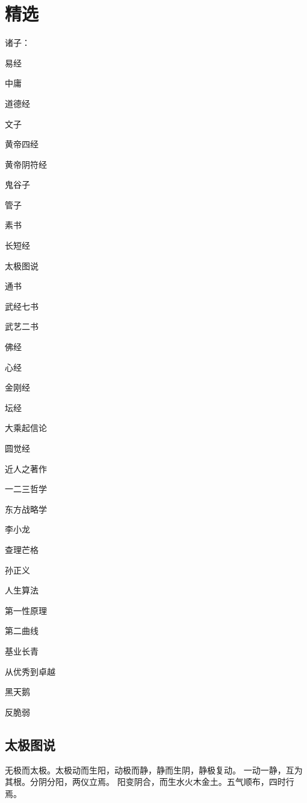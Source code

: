\chapter{精选}

诸子：
\begin{enumbox}
\item 易经
\item 中庸
\item 道德经
\item 文子
\item 黄帝四经
\item 黄帝阴符经
\item 鬼谷子
\item 管子
\item 素书
\item 长短经
\item 太极图说
\item 通书
\item 武经七书
\item 武艺二书
\end{enumbox}

佛经
\begin{enumbox}
\item 心经
\item 金刚经
\item 坛经
\item 大乘起信论
\item 圆觉经
\end{enumbox}

近人之著作
\begin{enumbox}
\item 一二三哲学
\item 东方战略学
\item 李小龙
\item 查理芒格
\item 孙正义
\item 人生算法
\item 第一性原理
\item 第二曲线
\item 基业长青
\item 从优秀到卓越
\item 黑天鹅
\item 反脆弱
\end{enumbox}

\section{太极图说}

无极而太极。太极动而生阳，动极而静，静而生阴，静极复动。
一动一静，互为其根。分阴分阳，两仪立焉。
阳变阴合，而生水火木金土。五气顺布，四时行焉。

